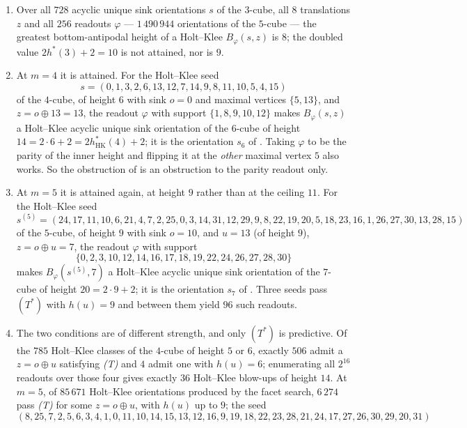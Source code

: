 \begin{proposition}\label{hkd:doubling}
\begin{enumerate}
\item[(a)] Over all $728$ acyclic unique sink orientations $s$ of the
$3$-cube, all $8$ translations $z$ and all $256$ readouts $\varphi$
--- $1\,490\,944$ orientations of the $5$-cube --- the greatest
bottom-antipodal height of a Holt--Klee $B_\varphi(s,z)$ is $8$; the
doubled value $2h^{\ast}(3)+2=10$ is not attained, nor is $9$.
\item[(b)] At $m=4$ it is attained. For the Holt--Klee seed
\[
  s=(0,1,3,2,6,13,12,7,14,9,8,11,10,5,4,15)
\]
of the $4$-cube, of height $6$ with sink $o=0$ and maximal vertices
$\{5,13\}$, and $z=o\oplus13=13$, the readout $\varphi$ with support
$\{1,8,9,10,12\}$ makes $B_\varphi(s,z)$ a Holt--Klee acyclic unique sink
orientation of the $6$-cube of height $14=2\cdot6+2=
2h^{\ast}_{\mathrm{HK}}(4)+2$; it is the orientation $s_6$ of
. Taking $\varphi$ to be the parity of the inner
height and flipping it at the \emph{other} maximal vertex $5$ also works.
So the obstruction of  is an obstruction to the
parity readout only.
\item[(c)] At $m=5$ it is attained again, at height $9$ rather than at
the ceiling $11$. For the Holt--Klee seed
\[
 s^{(5)}=(24,17,11,10,6,21,4,7,2,25,0,3,14,31,12,29,
          9,8,22,19,20,5,18,23,16,1,26,27,30,13,28,15)
\]
of the $5$-cube, of height $9$ with sink $o=10$, and $u=13$ (of height
$9$), $z=o\oplus u=7$, the readout $\varphi$ with support
\[
 \{0,2,3,10,12,14,16,17,18,19,22,24,26,27,28,30\}
\]
makes $B_\varphi(s^{(5)},7)$ a Holt--Klee acyclic unique sink orientation
of the $7$-cube of height $20=2\cdot9+2$; it is the orientation $s_7$ of
. Three seeds pass $(T^{\ast})$ with $h(u)=9$ and
between them yield $96$ such readouts.
\item[(d)] The two conditions are of different strength, and only
$(T^{\ast})$ is predictive. Of the $785$ Holt--Klee classes of the
$4$-cube of height $5$ or $6$, exactly $506$ admit a $z=o\oplus u$
satisfying \emph{(T)} and $4$ admit one with $h(u)=6$; enumerating all
$2^{16}$ readouts over those four gives exactly $36$ Holt--Klee blow-ups
of height $14$. At $m=5$, of $85\,671$ Holt--Klee orientations produced by
the facet search, $6\,274$ pass \emph{(T)} for some $z=o\oplus u$, with
$h(u)$ up to $9$; the seed
\[
 (8,25,7,2,5,6,3,4,1,0,11,10,14,15,13,12,
  16,9,19,18,22,23,28,21,24,17,27,26,30,29,20,31)
\]
\end{enumerate}
\end{proposition}
